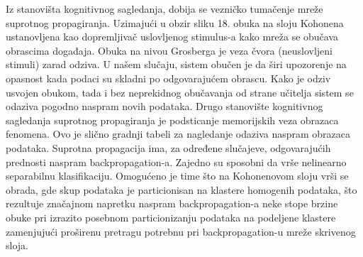 \documentclass[fontsize=11bp, paper=a4]{scrarticle}
\begin{document}
Iz stanovišta kognitivnog sagledanja, dobija se vezničko tumačenje mreže suprotnog propagiranja. Uzimajući u obzir sliku 18. obuka na sloju Kohonena ustanovljena kao dopremljivač uslovljenog stimulus-a kako mreža se obučava obrascima događaja. Obuka na nivou Grosberga je veza čvora (neuslovljeni stimuli) zarad odziva. U našem slučaju, sistem obučen je da širi upozorenje na opasnost kada podaci su skladni po odgovarajućem obrascu. Kako je odziv usvojen obukom, tada i bez neprekidnog obučavanja od strane učitelja sistem se odaziva pogodno naspram novih podataka. Drugo stanovište kognitivnog sagledanja suprotnog propagiranja je podsticanje memorijskih veza obrazaca fenomena. Ovo je slično gradnji tabeli za nagledanje odaziva naspram obrazaca podataka. Suprotna propagacija ima, za određene slučajeve, odgovarajućih prednosti naspram backpropagation-a. Zajedno su sposobni da vrše nelinearno separabilnu klasifikaciju. Omogućeno je time što na Kohonenovom sloju vrši se obrada, gde skup podataka je particionisan na klastere homogenih podataka, što rezultuje značajnom napretku naspram backpropagation-a neke stope brzine obuke pri izrazito posebnom particionizanju podataka na podeljene klastere zamenjujući proširenu pretragu potrebnu pri backpropagation-u mreže skrivenog sloja. 
\end{document}

